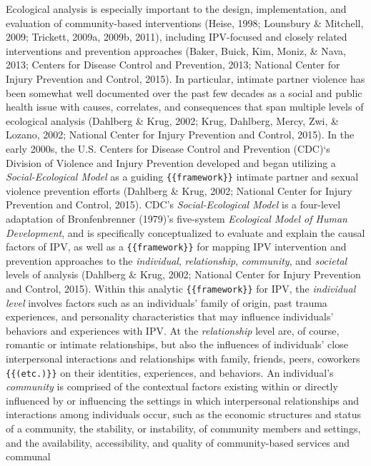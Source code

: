 \documentclass[11pt,]{tufte-book}
\begin{document}
Ecological analysis is especially important to the design,
implementation, and evaluation of community-based interventions (Heise,
1998; Lounsbury \& Mitchell, 2009; Trickett, 2009a, 2009b, 2011),
including IPV-focused and closely related interventions and prevention
approaches (Baker, Buick, Kim, Moniz, \& Nava, 2013; Centers for Disease
Control and Prevention, 2013; National Center for Injury Prevention and
Control, 2015). In particular, intimate partner violence has been
somewhat well documented over the past few decades as a social and
public health issue with causes, correlates, and consequences that span
multiple levels of ecological analysis (Dahlberg \& Krug, 2002; Krug,
Dahlberg, Mercy, Zwi, \& Lozano, 2002; National Center for Injury
Prevention and Control, 2015). In the early 2000s, the U.S. Centers for
Disease Control and Prevention (CDC)`s Division of Violence and Injury
Prevention developed and began utilizing a \emph{Social-Ecological
Model} as a guiding \texttt{\{\{framework\}\}} intimate partner and
sexual violence prevention efforts (Dahlberg \& Krug, 2002; National
Center for Injury Prevention and Control, 2015). CDC's
\emph{Social-Ecological Model} is a four-level adaptation of
Bronfenbrenner (1979)'s five-system \emph{Ecological Model of Human
Development}, and is specifically conceptualized to evaluate and explain
the causal factors of IPV, as well as a \texttt{\{\{framework\}\}} for
mapping IPV intervention and prevention approaches to the
\emph{individual}, \emph{relationship}, \emph{community}, and
\emph{societal} levels of analysis (Dahlberg \& Krug, 2002; National
Center for Injury Prevention and Control, 2015). Within this analytic
\texttt{\{\{framework\}\}} for IPV, the \emph{individual level} involves
factors such as an individuals' family of origin, past trauma
experiences, and personality characteristics that may influence
individuals' behaviors and experiences with IPV. At the
\emph{relationship} level are, of course, romantic or intimate
relationships, but also the influences of individuals' close
interpersonal interactions and relationships with family, friends,
peers, coworkers \texttt{\{\{(etc.)\}\}} on their identities,
experiences, and behaviors. An individual's \emph{community} is
comprised of the contextual factors existing within or directly
influenced by or influencing the settings in which interpersonal
relationships and interactions among individuals occur, such as the
economic structures and status of a community, the stability, or
instability, of community members and settings, and the availability,
accessibility, and quality of community-based services and communal
\end{document}
